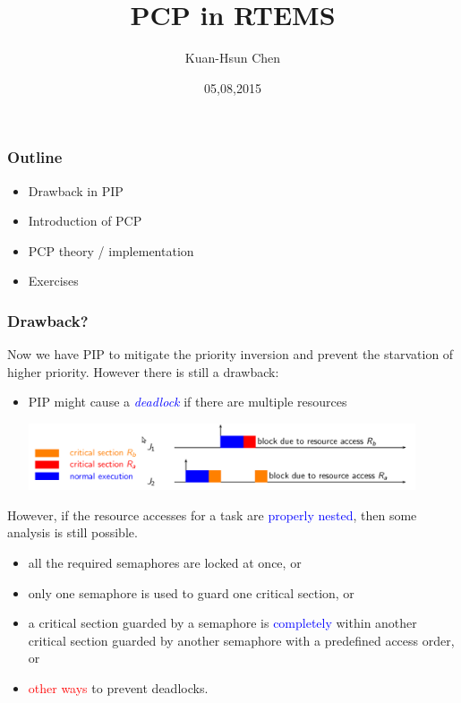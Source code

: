 \documentclass[t]{beamer}
\title{PCP in RTEMS}
\author{Kuan-Hsun Chen}
\institute{LS 12, TU Dortmund}
\date{05,08,2015}
\newcommand{\red}[1]{\textcolor{red}{#1}}
\newcommand{\blue}[1]{\textcolor{blue}{#1}}
\begin{document}
\maketitle

\begin{frame}
\frametitle{Outline}

\begin{itemize}

\item Drawback in PIP

\item Introduction of PCP

\item PCP theory / implementation

\item Exercises

\end{itemize} %
\end{frame}

\begin{frame}
\frametitle{Drawback?}
Now we have PIP to mitigate the priority inversion and prevent the starvation of higher priority. However there is still a drawback:
\begin{itemize}
  \item PIP might cause a \emph{\textcolor{blue}{deadlock}} if there are
  multiple resources

    \includegraphics[width=0.9\textwidth]{PIP-deadlock}

  \end{itemize}
  
  However, if the resource accesses for a task are \blue{properly
    nested}, then some analysis is still possible.
  \begin{itemize}
  \item all the required semaphores are locked at once, or
  \item only one semaphore is used to guard one critical section, or
  \item a critical section guarded by a semaphore is \blue{completely} within another
    critical section guarded by another semaphore with a predefined
    access order, or
  \item \red{other ways} to prevent deadlocks. 
  \end{itemize}
\end{frame}
\end{document}

